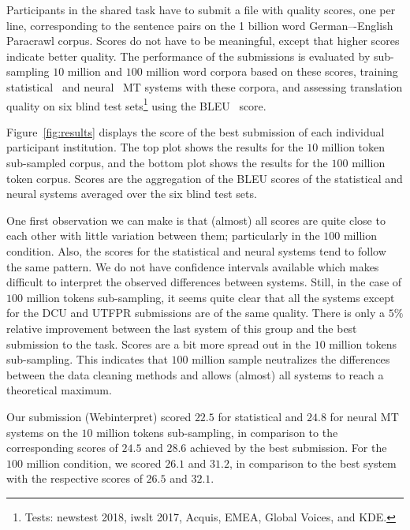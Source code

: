 Participants in the shared task have to submit a file with quality scores, one per line, corresponding to the sentence pairs on the 1 billion word German–-English Paracrawl corpus. Scores do not have to be meaningful, except that higher scores indicate better quality. The performance of the submissions is evaluated by sub-sampling $10$ million and $100$ million word corpora based on these scores, training statistical~\cite{Moses} and neural~\cite{Marian} MT systems with these corpora, and assessing translation quality on six blind test sets\footnote{Tests: newstest 2018, iwslt 2017, Acquis, EMEA, Global Voices, and KDE.} using the BLEU~\cite{Bleu} score. 

Figure~\ref{fig:results} displays the score of the best submission of each individual participant institution. The top plot shows the results for the $10$ million token sub-sampled corpus, and the bottom plot shows the results for the $100$ million token corpus. Scores are the aggregation of the BLEU scores of the statistical and neural systems averaged over the six blind test sets.

One first observation we can make is that (almost) all scores are quite close to each other with little variation between them; particularly in the $100$ million condition. Also, the scores for the statistical and neural systems tend to follow the same pattern. We do not have confidence intervals available which makes difficult to interpret the observed differences between systems. Still, in the case of $100$ million tokens sub-sampling, it seems quite clear that all the systems except for the DCU and UTFPR submissions are of the same quality. There is only a $5\%$ relative improvement between the last system of this group and the best submission to the task. Scores are a bit more spread out in the $10$ million tokens sub-sampling. This indicates that $100$ million sample neutralizes the differences between the data cleaning methods and allows (almost) all systems to reach a theoretical maximum.

Our submission (Webinterpret) scored $22.5$ for statistical and $24.8$ for neural MT systems on the $10$ million tokens sub-sampling, in comparison to the corresponding scores of $24.5$ and $28.6$ achieved by the best submission. For the $100$ million condition, we scored $26.1$ and $31.2$, in comparison to the best system with the respective scores of $26.5$ and $32.1$. 
